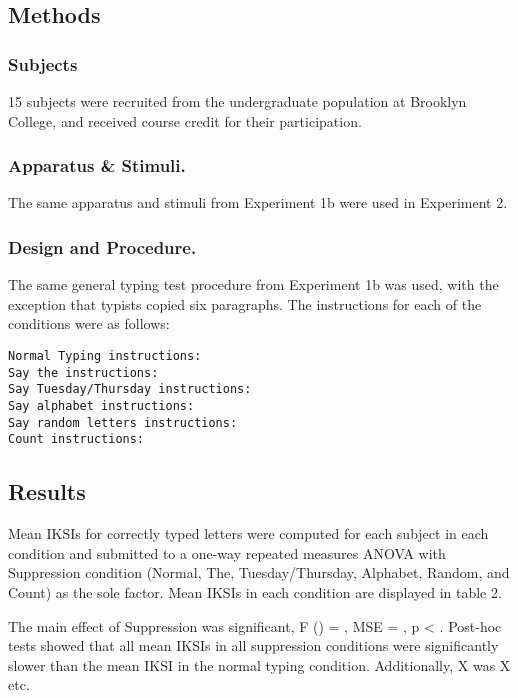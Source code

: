 \documentclass[,man,floatsintext]{apa6}
\begin{document}
\hypertarget{methods-1}{%
\subsection{Methods}\label{methods-1}}

\hypertarget{subjects-1}{%
\subsubsection{Subjects}\label{subjects-1}}

15 subjects were recruited from the undergraduate population at Brooklyn College, and received course credit for their participation.

\hypertarget{apparatus-stimuli.}{%
\subsubsection{Apparatus \& Stimuli.}\label{apparatus-stimuli.}}

The same apparatus and stimuli from Experiment 1b were used in Experiment 2.

\hypertarget{design-and-procedure.}{%
\subsubsection{Design and Procedure.}\label{design-and-procedure.}}

The same general typing test procedure from Experiment 1b was used, with the exception that typists copied six paragraphs. The instructions for each of the conditions were as follows:

\begin{verbatim}
Normal Typing instructions:
Say the instructions:
Say Tuesday/Thursday instructions:
Say alphabet instructions:
Say random letters instructions:
Count instructions:
\end{verbatim}

\hypertarget{results-1}{%
\subsection{Results}\label{results-1}}

Mean IKSIs for correctly typed letters were computed for each subject in each condition and submitted to a one-way repeated measures ANOVA with Suppression condition (Normal, The, Tuesday/Thursday, Alphabet, Random, and Count) as the sole factor. Mean IKSIs in each condition are displayed in table 2.

The main effect of Suppression was significant, F () = , MSE = , p \textless{} . Post-hoc tests showed that all mean IKSIs in all suppression conditions were significantly slower than the mean IKSI in the normal typing condition. Additionally, X was X etc.
\end{document}
